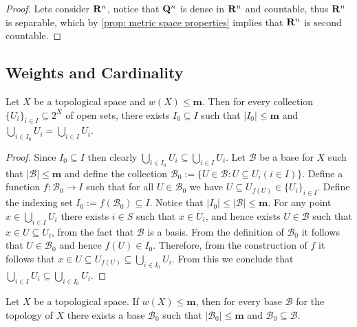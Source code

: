 \begin{proof}
Lets consider \(\mathbf{R}^n\), notice that \(\mathbf{Q}^n\) is dense in \(\mathbf{R}^n\) and countable,
thus \(\mathbf{R}^n\) is separable, which by \cref{prop: metric space properties}
implies that \(\mathbf{R}^n\) is second countable.
\end{proof}

\subsection{Weights and Cardinality}

\begin{proposition}\label{prop: weight m space subset union}
  Let \(X\) be a topological space and \(w(X) \leq \mathbf m\). Then for every
  collection \(\{U_i\}_{i \in I} \subseteq 2^X\) of open sets, there exists
  \(I_0 \subseteq I\) such that \(|I_0| \leq \mathbf m\) and \(\bigcup_{i \in
  I_0} U_i = \bigcup_{i \in  I} U_i\).
\end{proposition}

\begin{proof}
  Since \(I_0 \subseteq I\) then clearly \(\bigcup_{i \in  I_0} U_i \subseteq
  \bigcup_{i \in  I} U_i\). Let \(\mathcal B\) be a base for \(X\) such that
  \(|\mathcal B| \leq \mathbf m\) and define the collection \(\mathcal B_0 :=
  \{U \in \mathcal B : U \subseteq U_i (i \in I)\}\). Define a function \(f:
  \mathcal B_0 \to I\) such that for all \(U \in \mathcal B_0\) we have \(U
  \subseteq  U_{f(U)} \in \{U_i\}_{i \in I}\). Define the indexing set \(I_0 :=
  f(\mathcal B_0) \subseteq I\). Notice that \(|I_0| \leq |\mathcal B| \leq
  \mathbf m\). For any point \(x \in \bigcup_{i \in  I} U_i\) there exists \(i
  \in S\) such that \(x \in U_i\), and hence exists \(U \in \mathcal B\) such
  that \(x \in U \subseteq U_i\), from the fact that \(\mathcal B\) is a basis.
  From the definition of \(\mathcal B_0\) it follows that \(U \in \mathcal B_0\)
  and hence \(f(U) \in I_0\). Therefore, from the construction of \(f\) it
  follows that \(x \in U \subseteq U_{f(U)} \subseteq \bigcup_{i \in  I_0}
  U_i\). From this we conclude that \(\bigcup_{i \in  I} U_i \subseteq
  \bigcup_{i \in  I_0} U_i\).
\end{proof}

\begin{proposition}
  Let \(X\) be a topological space. If \(w(X) \leq \mathbf m\), then for every base
  \(\mathcal B\) for the topology of \(X\) there exists a base \(\mathcal B_0\)
  such that \(|\mathcal B_0| \leq \mathbf m\) and \(\mathcal B_0 \subseteq
  \mathcal B\).
\end{proposition}

